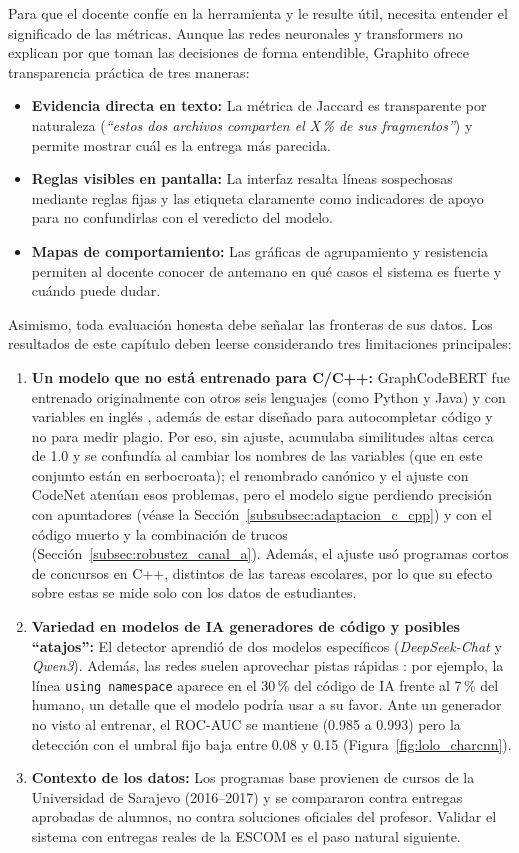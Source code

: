 Para que el docente confíe en la herramienta y le resulte útil, necesita entender el significado de las métricas. Aunque las redes neuronales y transformers no explican por que toman las decisiones de forma entendible, Graphito ofrece transparencia práctica de tres maneras:
\begin{itemize}
    \item \textbf{Evidencia directa en texto:} La métrica de Jaccard es transparente por naturaleza (\textit{``estos dos archivos comparten el X\,\% de sus fragmentos''}) y permite mostrar cuál es la entrega más parecida.
    \item \textbf{Reglas visibles en pantalla:} La interfaz resalta líneas sospechosas mediante reglas fijas y las etiqueta claramente como indicadores de apoyo para no confundirlas con el veredicto del modelo.
    \item \textbf{Mapas de comportamiento:} Las gráficas de agrupamiento y resistencia permiten al docente conocer de antemano en qué casos el sistema es fuerte y cuándo puede dudar.
\end{itemize}

Asimismo, toda evaluación honesta debe señalar las fronteras de sus datos. Los resultados de este capítulo deben leerse considerando tres limitaciones principales:
\begin{enumerate}
    \item \textbf{Un modelo que no está entrenado para C/C++:} GraphCodeBERT fue entrenado originalmente con otros seis lenguajes (como Python y Java) y con variables en inglés \cite{Guo2021GraphCodeBERT}, además de estar diseñado para autocompletar código y no para medir plagio. Por eso, sin ajuste, acumulaba similitudes altas cerca de 1.0 y se confundía al cambiar los nombres de las variables (que en este conjunto están en serbocroata); el renombrado canónico y el ajuste con CodeNet atenúan esos problemas, pero el modelo sigue perdiendo precisión con apuntadores (véase la Sección~\ref{subsubsec:adaptacion_c_cpp}) y con el código muerto y la combinación de trucos (Sección~\ref{subsec:robustez_canal_a}). Además, el ajuste usó programas cortos de concursos en C++, distintos de las tareas escolares, por lo que su efecto sobre estas se mide solo con los datos de estudiantes.
    \item \textbf{Variedad en modelos de IA generadores de código y posibles ``atajos'':} El detector aprendió de dos modelos específicos (\textit{DeepSeek-Chat} y \textit{Qwen3}). Además, las redes suelen aprovechar pistas rápidas \cite{Geirhos2020Shortcut}: por ejemplo, la línea \texttt{using namespace} aparece en el 30\,\% del código de IA frente al 7\,\% del humano, un detalle que el modelo podría usar a su favor. Ante un generador no visto al entrenar, el ROC-AUC se mantiene (0.985 a 0.993) pero la detección con el umbral fijo baja entre 0.08 y 0.15 (Figura~\ref{fig:lolo_charcnn}).
    \item \textbf{Contexto de los datos:} Los programas base provienen de cursos de la Universidad de Sarajevo (2016--2017) y se compararon contra entregas aprobadas de alumnos, no contra soluciones oficiales del profesor. Validar el sistema con entregas reales de la ESCOM es el paso natural siguiente.
\end{enumerate}

